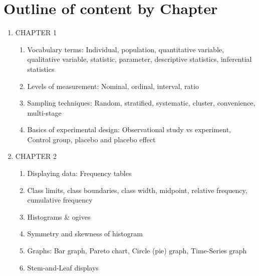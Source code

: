 \documentclass{article}
\begin{document}
\section*{Outline of content by Chapter}

\begin{enumerate}

    \item CHAPTER 1
    
        \begin{enumerate}
        
            \item Vocabulary terms: Individual, population, quantitative variable, qualitative variable, statistic, parameter, descriptive statistics, inferential statistics
            
            \item Levels of measurement: Nominal, ordinal, interval, ratio
            
            \item Sampling techniques: Random, stratified, systematic, cluster, convenience, multi-stage
            
            \item Basics of experimental design: Observational study vs experiment, Control group, placebo and placebo effect
            
        \end{enumerate}
        
    \item CHAPTER 2
    
        \begin{enumerate}
        
            \item Displaying data: Frequency tables 
            
            \item Class limits, class boundaries, class width, midpoint, relative frequency, cumulative frequency
            
            \item Histograms \& ogives
            
            \item Symmetry and skewness of histogram
            
            \item Graphs: Bar graph, Pareto chart, Circle (pie) graph, Time-Series graph
            
            \item Stem-and-Leaf displays
            

\end{enumerate}
\end{enumerate}
\end{document}
